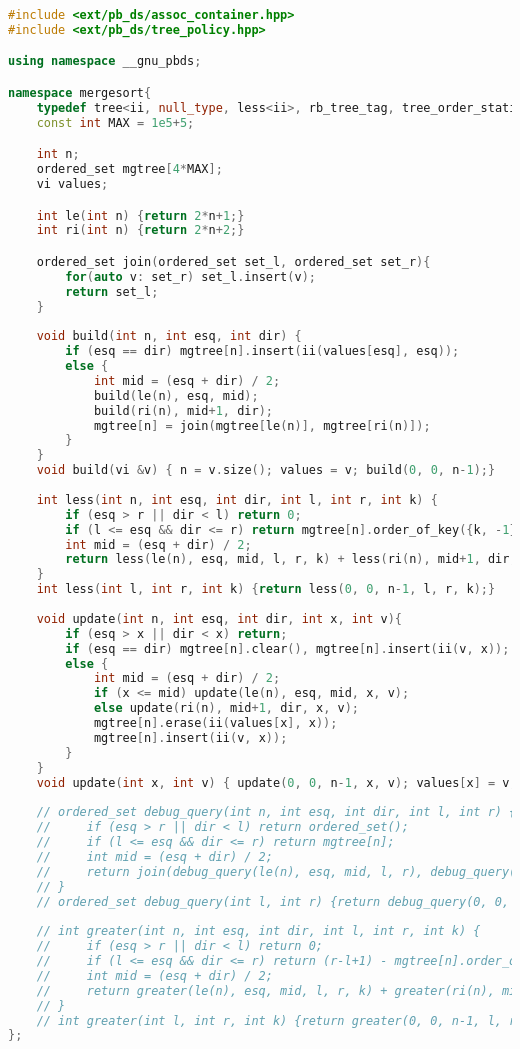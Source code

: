 \documentclass[11pt, a4paper, twoside]{article}
\begin{document}
\begin{lstlisting}[language=C++]
#include <ext/pb_ds/assoc_container.hpp>
#include <ext/pb_ds/tree_policy.hpp>

using namespace __gnu_pbds;

namespace mergesort{
    typedef tree<ii, null_type, less<ii>, rb_tree_tag, tree_order_statistics_node_update> ordered_set;
    const int MAX = 1e5+5;

    int n;
    ordered_set mgtree[4*MAX];
    vi values;

    int le(int n) {return 2*n+1;}
    int ri(int n) {return 2*n+2;}

    ordered_set join(ordered_set set_l, ordered_set set_r){
        for(auto v: set_r) set_l.insert(v);
        return set_l;
    }
    
    void build(int n, int esq, int dir) {
        if (esq == dir) mgtree[n].insert(ii(values[esq], esq));
        else {
            int mid = (esq + dir) / 2;
            build(le(n), esq, mid);
            build(ri(n), mid+1, dir);
            mgtree[n] = join(mgtree[le(n)], mgtree[ri(n)]);
        }
    }
    void build(vi &v) { n = v.size(); values = v; build(0, 0, n-1);}
    
    int less(int n, int esq, int dir, int l, int r, int k) {
        if (esq > r || dir < l) return 0;
        if (l <= esq && dir <= r) return mgtree[n].order_of_key({k, -1});
        int mid = (esq + dir) / 2;
        return less(le(n), esq, mid, l, r, k) + less(ri(n), mid+1, dir, l, r, k);
    }
    int less(int l, int r, int k) {return less(0, 0, n-1, l, r, k);}
    
    void update(int n, int esq, int dir, int x, int v){
        if (esq > x || dir < x) return;
        if (esq == dir) mgtree[n].clear(), mgtree[n].insert(ii(v, x));
        else {
            int mid = (esq + dir) / 2;
            if (x <= mid) update(le(n), esq, mid, x, v);
            else update(ri(n), mid+1, dir, x, v);
            mgtree[n].erase(ii(values[x], x));
            mgtree[n].insert(ii(v, x));
        }
    }
    void update(int x, int v) { update(0, 0, n-1, x, v); values[x] = v;}
    
    // ordered_set debug_query(int n, int esq, int dir, int l, int r) {
    //     if (esq > r || dir < l) return ordered_set();
    //     if (l <= esq && dir <= r) return mgtree[n];
    //     int mid = (esq + dir) / 2;
    //     return join(debug_query(le(n), esq, mid, l, r), debug_query(ri(n), mid+1, dir, l, r));
    // }
    // ordered_set debug_query(int l, int r) {return debug_query(0, 0, n-1, l, r);}
    
    // int greater(int n, int esq, int dir, int l, int r, int k) {
    //     if (esq > r || dir < l) return 0;
    //     if (l <= esq && dir <= r) return (r-l+1) - mgtree[n].order_of_key({k, 1e8});
    //     int mid = (esq + dir) / 2;
    //     return greater(le(n), esq, mid, l, r, k) + greater(ri(n), mid+1, dir, l, r, k);
    // }
    // int greater(int l, int r, int k) {return greater(0, 0, n-1, l, r, k);}
};
\end{lstlisting}
\end{document}
